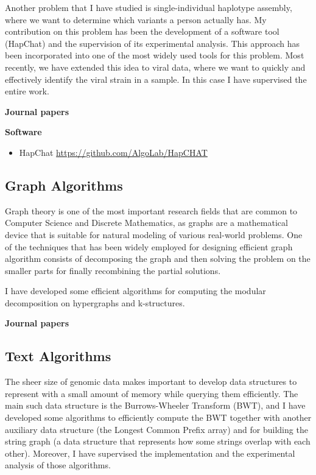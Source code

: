 \documentclass[11pt,a4paper,roman]{moderncv}
\begin{document}
Another problem that I have studied is single-individual haplotype assembly, where we want to
determine which variants a person actually has.
My contribution on this problem has been the development of a software tool
(HapChat) and the supervision of its experimental analysis.
This approach has been incorporated into one of the most widely used tools for
this problem.
Most recently, we have extended this idea to viral data, where we want to
quickly and effectively identify the viral strain in a sample.
In this case I have supervised the entire work.


\textbf{Journal papers}

\cite{ciccolellaMALVIRUSIntegratedApplication2022}
\cite{DBLP:journals/bmcbi/BerettaPZVB18}
\cite{DBLP:journals/tcbb/PirolaVBSB12}
\cite{DBLP:journals/tcbb/BonizzoniVDPR10}
\cite{DBLP:journals/ijbra/BonizzoniVDM05}
\cite{DBLP:journals/jcst/BonizzoniVDL03}

\textbf{Software}

\begin{itemize}
\item
      HapChat \url{https://github.com/AlgoLab/HapCHAT}
\end{itemize}

\subsection{Graph Algorithms}\label{graph-algorithms}

Graph theory is one of the most
important research fields that are common to Computer Science and
Discrete Mathematics, as graphs are a mathematical device that is
suitable for natural modeling of various real-world problems. One of the
techniques that has been widely employed for designing efficient graph
algorithm consists of decomposing the graph and then solving the problem
on the smaller parts for finally recombining the partial solutions.

I have developed some efficient algorithms for
computing the modular decomposition on hypergraphs and k-structures.


\textbf{Journal papers}

\cite{DBLP:journals/jal/BonizzoniV99}


\subsection{Text Algorithms}\label{bwt}

The sheer size of genomic data makes important to develop data structures to
represent with a small amount of memory while querying them efficiently.
The main such data structure is the Burrows-Wheeler Transform (BWT), and I have
developed some algorithms to efficiently compute the BWT together with another
auxiliary data structure (the Longest Common Prefix array) and for building the
string graph (a data structure that represents how some strings overlap with
each other).
Moreover, I have supervised the implementation and the experimental analysis of
those algorithms.
\end{document}
